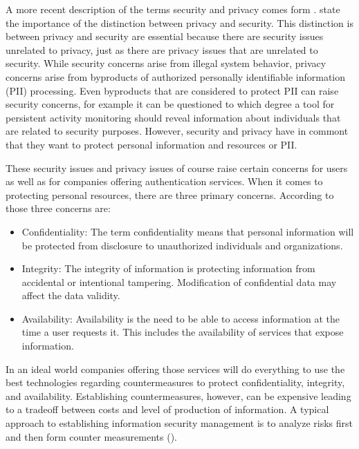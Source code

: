A more recent description of the terms security and privacy comes form \cite{Brooks:2017:IPE}. \cite{Brooks:2017:IPE} state the importance of the distinction between privacy and security. This distinction is between privacy and security are essential because there are security issues unrelated to privacy, just as there are privacy issues that are unrelated to security. While security concerns arise from illegal system behavior, privacy concerns arise from byproducts of authorized personally identifiable information (PII) processing. Even byproducts that are considered to protect PII can raise security concerns, for example it can be questioned to which degree a tool for persistent activity monitoring should reveal information about individuals that are related to security purposes. However, security and privacy have in commont that they want to protect personal information and resources or PII.

These security issues and privacy issues of course raise certain concerns for users as well as for companies offering authentication services. When it comes to protecting personal resources, there are three primary concerns. According to \cite{Todorov:2007:MUI} those three concerns are:  

\begin{itemize}
	\item Confidentiality: The term confidentiality means that personal information will be protected from 
	disclosure to unauthorized individuals and organizations.
	\item Integrity: The integrity of information is protecting information from accidental or intentional
	tampering. Modification of confidential data may affect the data validity. 
	\item Availability: Availability is the need to be able to access information at the time a user requests it. 
	This includes the availability of services that expose information. 
\end{itemize}

In an ideal world companies offering those services will do everything to use the best technologies regarding countermeasures to protect confidentiality, integrity, and availability. Establishing countermeasures, however, can be expensive leading to a tradeoff between costs and level of production of information. A typical approach to establishing information security management is to analyze risks first and then form counter measurements (\cite{Todorov:2007:MUI}). 



